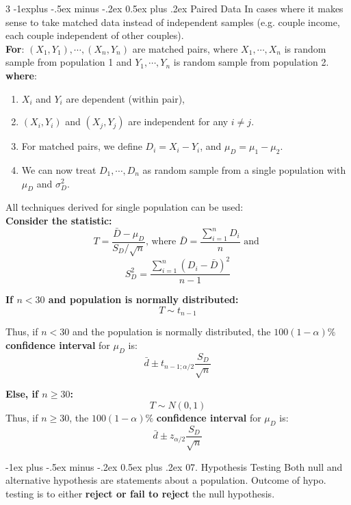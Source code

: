 \documentclass[8pt, a4paper, landscape]{article}
\makeatletter
\renewcommand{\section}{\@startsection{section}{1}{0mm}%
                                {-1ex plus -.5ex minus -.2ex}%
                                {0.5ex plus .2ex}%
                                {\normalfont\large\bfseries}}
\renewcommand{\subsection}{\@startsection{subsection}{2}{0.1mm}%
                                {-1explus -.5ex minus -.2ex}%
                                {0.5ex plus .2ex}%
                                {\normalfont\normalsize\bfseries}}
\makeatother
\begin{document}
\begin{multicols*}{3}
\subsection{Paired Data}
In cases where it makes sense to take matched data instead of independent samples (e.g. couple income, each couple independent of other couples).
\\ \smallskip
\textbf{For}: $(X_1, Y_1), \cdots, (X_n, Y_n)$ are matched pairs, where $X_1, \cdots, X_n$ is random sample from population 1 and $Y_1, \cdots, Y_n$ is random sample from population 2.
\\ \smallskip
 \textbf{where}:
\smallskip
\begin{enumerate}
    \item $X_i$ and $Y_i$ are dependent (within pair),
    \item $(X_i, Y_i)$ and $(X_j, Y_j)$ are independent for any $i \neq j$.
    \item For matched pairs, we define $D_i = X_i - Y_i$, and  $\mu_D = \mu_1 - \mu_2$.
    \item We can now treat $D_1, \cdots, D_n$ as random sample from a single population with $\mu_D$ and $\sigma_D^2$. 
\end{enumerate}
\smallskip
All techniques derived for single population can be used:
\medskip
\\ \textbf{Consider the statistic:}
\[T = \frac{\bar{D} - \mu_D}{S_D / \sqrt{n}} \text{, where } \bar{D} = \frac{\sum _{i=1} ^n D_i}{n} \text{ and }\]
\smallskip
\[S_D^2 = \frac{\sum _{i=1} ^n (D_i - \bar{D})^2}{n-1}\]
\smallskip

\textbf{If $n < 30$ and population is normally distributed:}
\[T \sim t_{n-1}\]

\smallskip
Thus, if $n < 30$ and the population is normally distributed, the \textbf{$100(1-\alpha)\%$ confidence interval} for $\mu_D$ is:
\[\bar{d} \pm t_{n-1; \alpha/2} \frac{S_D}{\sqrt{n}}\]


\medskip
\textbf{Else, if $n \geq 30$:}
\[T \sim N(0,1)\]
Thus, if $n \geq 30$, the $100(1-\alpha)\%$ \textbf{confidence interval} for $\mu_D$ is:
\[\bar{d} \pm z_{\alpha/2} \frac{S_D}{\sqrt{n}}\]


\section{07. Hypothesis Testing}
Both null and alternative hypothesis are statements about a population. Outcome of hypo. testing is to either \textbf{reject or fail to reject} the null hypothesis.


\end{multicols*}
\end{document}
